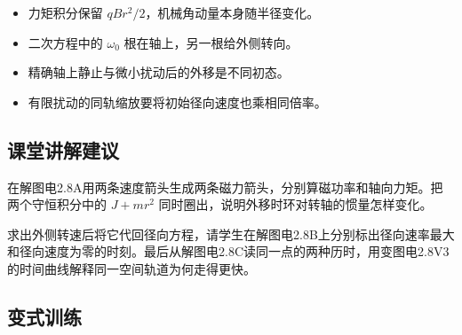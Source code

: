 \documentclass[UTF8,fontset=fandol,a4paper,11pt]{ctexart}
\begin{document}
\begin{itemize}
\item 力矩积分保留 $qBr^2/2$，机械角动量本身随半径变化。
\item 二次方程中的 $\omega_0$ 根在轴上，另一根给外侧转向。
\item 精确轴上静止与微小扰动后的外移是不同初态。
\item 有限扰动的同轨缩放要将初始径向速度也乘相同倍率。
\end{itemize}



\subsection*{课堂讲解建议}

在解图电2.8A用两条速度箭头生成两条磁力箭头，分别算磁功率和轴向力矩。把两个守恒积分中的 $J+mr^2$ 同时圈出，说明外移时环对转轴的惯量怎样变化。

求出外侧转速后将它代回径向方程，请学生在解图电2.8B上分别标出径向速率最大和径向速度为零的时刻。最后从解图电2.8C读同一点的两种历时，用变图电2.8V3的时间曲线解释同一空间轨道为何走得更快。


\subsection*{变式训练}
\end{document}
